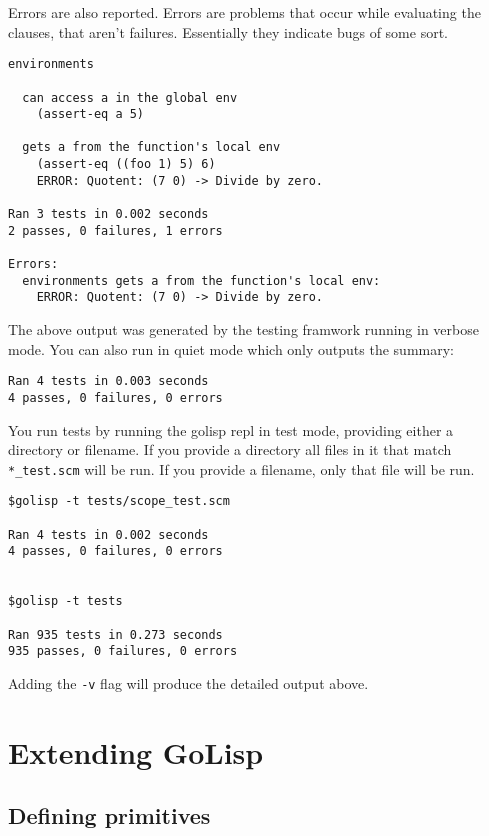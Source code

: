 \documentclass{article}
\begin{document}
Errors are also reported. Errors are problems that occur while evaluating the clauses, that
aren't failures. Essentially they indicate bugs of some sort.

\begin{verbatim}
environments

  can access a in the global env
    (assert-eq a 5)

  gets a from the function's local env
    (assert-eq ((foo 1) 5) 6)
    ERROR: Quotent: (7 0) -> Divide by zero.

Ran 3 tests in 0.002 seconds
2 passes, 0 failures, 1 errors

Errors:
  environments gets a from the function's local env:
    ERROR: Quotent: (7 0) -> Divide by zero.
\end{verbatim}

The above output was generated by the testing framwork running in verbose mode. You can also
run in quiet mode which only outputs the summary:

\begin{verbatim}
Ran 4 tests in 0.003 seconds
4 passes, 0 failures, 0 errors
\end{verbatim}

You run tests by running the golisp repl in test mode, providing either a directory or
filename. If you provide a directory all files in it that match \verb|*_test.scm| will be
run. If you provide a filename, only that file will be run.

\begin{verbatim}
$golisp -t tests/scope_test.scm

Ran 4 tests in 0.002 seconds
4 passes, 0 failures, 0 errors


$golisp -t tests

Ran 935 tests in 0.273 seconds
935 passes, 0 failures, 0 errors
\end{verbatim}

Adding the \verb|-v| flag will produce the detailed output above.

\section{Extending GoLisp}\label{sec:extending-golisp}

\subsection{Defining primitives}\label{sec:defining-primitives}
\end{document}
